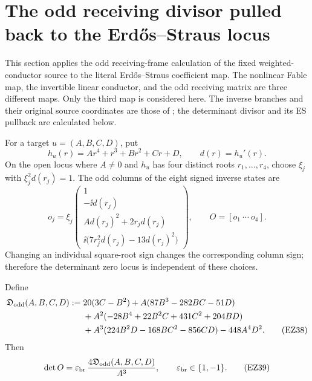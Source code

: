 \section{The odd receiving divisor pulled back to the Erd\H{o}s--Straus locus}
\label{sec:odd-receiver-pullback}

This section applies the odd receiving-frame calculation of the fixed
weighted-conductor source to the literal Erd\H{o}s--Straus coefficient map.
The nonlinear Fable map, the invertible linear conductor, and the odd receiving
matrix are three different maps.  Only the third map is considered here.
The inverse branches and their original source coordinates are those of
\cite[GF5--GF12]{SignedCover}; the determinant divisor and its ES pullback are
calculated below.

For a target \(u=(A,B,C,D)\), put
\[
 h_u(r)=Ar^4+r^3+Br^2+Cr+D,
 \qquad d(r)=h_u'(r).
\]
On the open locus where \(A\ne0\) and \(h_u\) has four distinct roots
\(r_1,\ldots,r_4\), choose \(\xi_j\) with
\(\xi_j^2d(r_j)=1\).  The odd columns of the eight signed inverse states are
\begin{equation}
 o_j=\xi_j
 \begin{pmatrix}
  1\\ -\ii d(r_j)\\ A d(r_j)^2+2r_jd(r_j)\\
  \ii\bigl(7r_j^2d(r_j)-13d(r_j)^2\bigr)
 \end{pmatrix},
 \qquad O=[o_1\ \cdots\ o_4].                         \tag{EZ37}
\end{equation}
Changing an individual square-root sign changes the corresponding column sign;
therefore the determinant zero locus is independent of these choices.

\begin{proposition}
\label{prop:odd-divisor}
Define
\begin{align}
 \mathfrak D_{\rm odd}(A,B,C,D)
 :={}&20(3C-B^2)+A(87B^3-282BC-51D)\nonumber\\
 &+A^2(-28B^4+22B^2C+431C^2+204BD)\nonumber\\
 &+A^3(224B^2D-168BC^2-856CD)-448A^4D^2.       \tag{EZ38}
\end{align}
Then
\begin{equation}
 \det O=\varepsilon_{\rm br}\,
 \frac{4\mathfrak D_{\rm odd}(A,B,C,D)}{A^3},
 \qquad \varepsilon_{\rm br}\in\{1,-1\}.             \tag{EZ39}
\end{equation}
\end{proposition}

